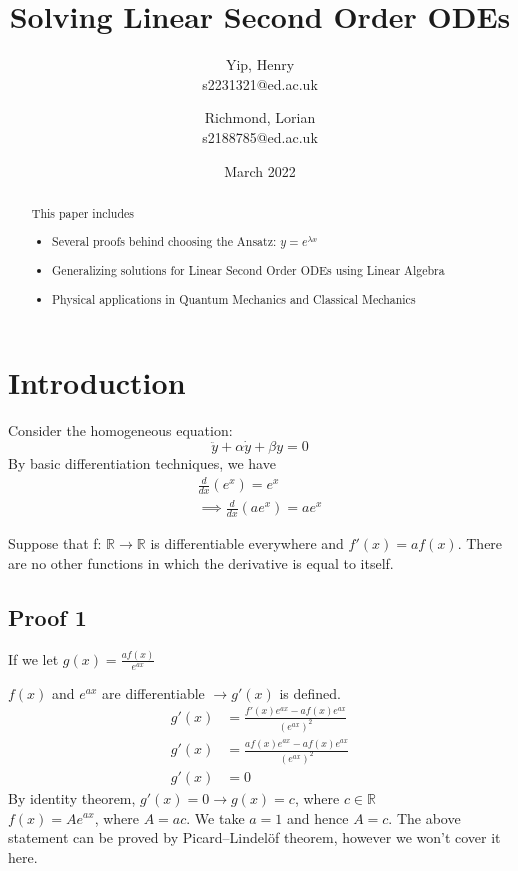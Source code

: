 \documentclass{article}
\title{Solving Linear Second Order ODEs}
\author{
    Yip, Henry\\
    s2231321@ed.ac.uk
    \and
    Richmond, Lorian\\
    s2188785@ed.ac.uk
}
\date{March 2022}
\begin{document}
\maketitle
\begin{abstract}
    This paper includes
    \begin{itemize}
     \item Several proofs behind choosing the Ansatz: $y=e^{\lambda x}$
     \item Generalizing solutions for Linear Second Order ODEs using Linear Algebra
     \item Physical applications in Quantum Mechanics and Classical Mechanics
     \end{itemize}
\end{abstract}
\section{Introduction}

Consider the homogeneous equation:
\begin{equation}
\ddot{y}+ \alpha\dot{y}+ \beta y = 0
\end{equation}
By basic differentiation techniques, we have 
 \begin{align}
 \frac{d}{dx}(e^x)=e^x\\
 \implies \frac{d}{dx}(ae^x)=ae^x
 \end{align}
 
 Suppose that f: $\mathbb{R} \rightarrow \mathbb{R}$ is differentiable everywhere and $f'(x)=af(x)$.
 There are no other functions in which the derivative is equal to itself. 
 \subsection{Proof 1}

 If we let $g(x)=\frac{af(x)}{e^{ax}}$


$ f(x)$ and $e^{ax}$ are differentiable $\rightarrow g'(x)$ is defined.
\begin{align}
     g'(x)&=\frac{f'(x)e^{ax}-af(x)e^{ax}}{(e^{ax})^2}\\
     g'(x)&=\frac{af(x)e^{ax}-af(x)e^{ax}}{(e^{ax})^2}\\
     g'(x)&=0
\end{align}
 By identity theorem, $g'(x)=0\rightarrow g(x)= c$, where $c\in \mathbb{R}$\\
 \implies $f(x)=Ae^{ax}$, where $A=ac$. We take $a=1$ and hence $A=c$.
 The above statement can be proved by Picard–Lindelöf theorem, however we won't cover it here.
\end{document}
